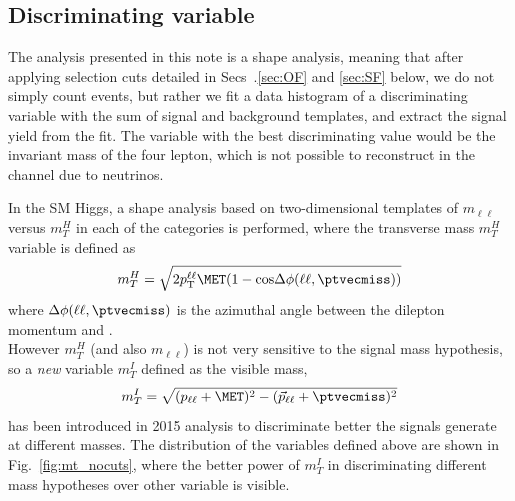 \subsection{Discriminating variable}
The analysis presented in this note is a shape analysis, meaning that after
applying selection cuts detailed in Secs~.\ref{sec:OF} and \ref{sec:SF} below,
we do not simply count events, but rather we fit a data histogram of a
discriminating variable with the sum of signal and background templates, and
extract the signal yield from the fit.
The variable with the best discriminating value would be the invariant mass of
the four lepton, which is not possible to reconstruct in the \WW channel due
to neutrinos.

In the SM Higgs,  a shape analysis based on two-dimensional templates of $m_{\ell \ell}$ versus $m_T^H$ in each of the categories is performed, where  the transverse mass  $m_T^H$ variable is defined as  
\begin{equation}
 m_T^H = \sqrt{2p_{\rm T}^{\ell\ell}\MET(1-\mathrm{cos}\Delta\phi(\ell\ell, \ptvecmiss))}
\end{equation}
where $\Delta\phi(\ell\ell, \ptvecmiss)$ is the azimuthal angle between the dilepton momentum and \ptvecmiss.\\
However  $m_T^H$ (and also $m_{\ell \ell}$) is not very sensitive to the
signal mass hypothesis, so a \textit{new} variable $m_T^I$ defined as the visible mass,
\begin{equation}
 m_T^I = \sqrt{ (p_\mathrm{\ell\ell} + \MET)^2 - (\vec{p}_\mathrm{\ell\ell} + \ptvecmiss)^2 }
\end{equation}
has been introduced in 2015 analysis to discriminate better the signals generate at different masses.
The distribution of the variables defined above are shown in
Fig.~\ref{fig:mt_nocuts}, where the better power of $m_T^I$ in discriminating
different mass hypotheses over other variable is visible.

